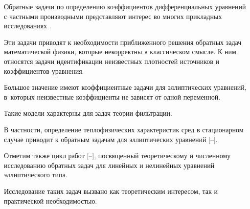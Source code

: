 





\date{16/VI/2014}





\makerutitle








Обратные задачи по определению коэффициентов дифференциальных уравнений с частными производными представляют интерес во многих прикладных исследованиях \cite{ali:bib:1, ali:bib:2}. 

Эти задачи приводят к необходимости приближенного решения обратных задач математической физики, которые некорректны в классическом смысле. К ним относятся задачи идентификации неизвестных плотностей источников и коэффициентов уравнения. 

Большое значение имеют коэффициентные задачи для эллиптических уравнений, в~которых неизвестные коэффициенты не зависят от одной переменной. 

Такие модели характерны для задач теории фильтрации. 

В частности, определение теплофизических характеристик сред в стационарном случае приводит к обратным задачам для эллиптических уравнений [--]. 

Отметим также цикл работ [--], посвященный теоретическому и численному исследованию обратных задач для линейных и нелинейных уравнений эллиптического типа. 

Исследование таких задач вызвано как теоретическим интересом, так и практической необходимостью.



